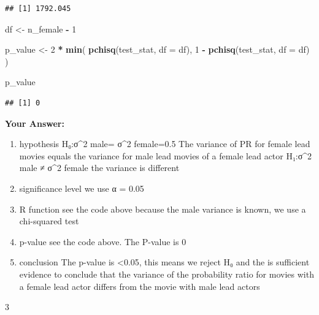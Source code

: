 \documentclass[
]{article}
\newenvironment{Shaded}{\begin{snugshade}}{\end{snugshade}}
\newcommand{\AttributeTok}[1]{\textcolor[rgb]{0.13,0.29,0.53}{#1}}
\newcommand{\DecValTok}[1]{\textcolor[rgb]{0.00,0.00,0.81}{#1}}
\newcommand{\FunctionTok}[1]{\textcolor[rgb]{0.13,0.29,0.53}{\textbf{#1}}}
\newcommand{\NormalTok}[1]{#1}
\newcommand{\OtherTok}[1]{\textcolor[rgb]{0.56,0.35,0.01}{#1}}
\newcommand{\SpecialCharTok}[1]{\textcolor[rgb]{0.81,0.36,0.00}{\textbf{#1}}}
\begin{document}
\begin{verbatim}
## [1] 1792.045
\end{verbatim}

\begin{Shaded}
\begin{Highlighting}[]
\NormalTok{df }\OtherTok{\textless{}{-}}\NormalTok{ n\_female }\SpecialCharTok{{-}} \DecValTok{1}

\NormalTok{p\_value }\OtherTok{\textless{}{-}} \DecValTok{2} \SpecialCharTok{*} \FunctionTok{min}\NormalTok{(}
  \FunctionTok{pchisq}\NormalTok{(test\_stat, }\AttributeTok{df =}\NormalTok{ df),}
  \DecValTok{1} \SpecialCharTok{{-}} \FunctionTok{pchisq}\NormalTok{(test\_stat, }\AttributeTok{df =}\NormalTok{ df)}
\NormalTok{)}

\NormalTok{p\_value}
\end{Highlighting}
\end{Shaded}

\begin{verbatim}
## [1] 0
\end{verbatim}

\textbf{Your Answer:}

\begin{enumerate}
\def\labelenumi{\arabic{enumi}.}
\item
  hypothesis H₀:σ\^{}2 male= σ\^{}2 female=0.5 The variance of PR for
  female lead movies equals the variance for male lead movies of a
  female lead actor H₁:σ\^{}2 male ≠ σ\^{}2 female the variance is
  different
\item
  significance level we use α = 0.05
\item
  R function see the code above because the male variance is known, we
  use a chi-squared test
\item
  p-value see the code above. The P-value is 0
\item
  conclusion The p-value is \textless0.05, this means we reject H₀ and
  the is sufficient evidence to conclude that the variance of the
  probability ratio for movies with a female lead actor differs from the
  movie with male lead actors
\end{enumerate}

3
\end{document}
